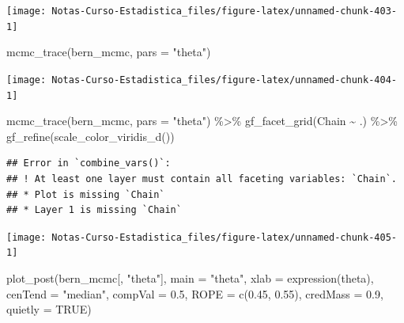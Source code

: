 \documentclass[
  12pt,
]{book}
\newenvironment{Shaded}{\begin{snugshade}}{\end{snugshade}}
\newcommand{\AttributeTok}[1]{\textcolor[rgb]{0.77,0.63,0.00}{#1}}
\newcommand{\ConstantTok}[1]{\textcolor[rgb]{0.00,0.00,0.00}{#1}}
\newcommand{\FloatTok}[1]{\textcolor[rgb]{0.00,0.00,0.81}{#1}}
\newcommand{\FunctionTok}[1]{\textcolor[rgb]{0.00,0.00,0.00}{#1}}
\newcommand{\NormalTok}[1]{#1}
\newcommand{\SpecialCharTok}[1]{\textcolor[rgb]{0.00,0.00,0.00}{#1}}
\newcommand{\StringTok}[1]{\textcolor[rgb]{0.31,0.60,0.02}{#1}}
\theoremstyle{definition}
\theoremstyle{definition}
\theoremstyle{definition}
\theoremstyle{definition}
\theoremstyle{remark}
\begin{document}
\begin{center}\texttt{[image: Notas-Curso-Estadistica\_files/figure-latex/unnamed-chunk-403-1]} \end{center}

\begin{Shaded}
\begin{Highlighting}[]
\FunctionTok{mcmc\_trace}\NormalTok{(bern\_mcmc, }\AttributeTok{pars =} \StringTok{"theta"}\NormalTok{)}
\end{Highlighting}
\end{Shaded}

\begin{center}\texttt{[image: Notas-Curso-Estadistica\_files/figure-latex/unnamed-chunk-404-1]} \end{center}

\begin{Shaded}
\begin{Highlighting}[]
\FunctionTok{mcmc\_trace}\NormalTok{(bern\_mcmc, }\AttributeTok{pars =} \StringTok{"theta"}\NormalTok{) }\SpecialCharTok{\%\textgreater{}\%}
    \FunctionTok{gf\_facet\_grid}\NormalTok{(Chain }\SpecialCharTok{\textasciitilde{}}\NormalTok{ .) }\SpecialCharTok{\%\textgreater{}\%}
    \FunctionTok{gf\_refine}\NormalTok{(}\FunctionTok{scale\_color\_viridis\_d}\NormalTok{())}
\end{Highlighting}
\end{Shaded}

\begin{verbatim}
## Error in `combine_vars()`:
## ! At least one layer must contain all faceting variables: `Chain`.
## * Plot is missing `Chain`
## * Layer 1 is missing `Chain`
\end{verbatim}

\begin{center}\texttt{[image: Notas-Curso-Estadistica\_files/figure-latex/unnamed-chunk-405-1]} \end{center}

\begin{Shaded}
\begin{Highlighting}[]
\FunctionTok{plot\_post}\NormalTok{(bern\_mcmc[, }\StringTok{"theta"}\NormalTok{], }\AttributeTok{main =} \StringTok{"theta"}\NormalTok{, }\AttributeTok{xlab =} \FunctionTok{expression}\NormalTok{(theta),}
    \AttributeTok{cenTend =} \StringTok{"median"}\NormalTok{, }\AttributeTok{compVal =} \FloatTok{0.5}\NormalTok{, }\AttributeTok{ROPE =} \FunctionTok{c}\NormalTok{(}\FloatTok{0.45}\NormalTok{,}
        \FloatTok{0.55}\NormalTok{), }\AttributeTok{credMass =} \FloatTok{0.9}\NormalTok{, }\AttributeTok{quietly =} \ConstantTok{TRUE}\NormalTok{)}
\end{Highlighting}
\end{Shaded}
\end{document}
